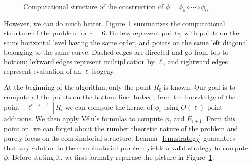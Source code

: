 \begin{figure}[t]
  \centering

  \caption{Computational structure of the construction of
    $\phi=\phi_5\circ\cdots\circ\phi_0$.}
  \label{fig:det}
\end{figure}

However, we can do much better. Figure~\ref{fig:det} summarizes the
computational structure of the problem for $e=6$.  Bullets represent
points, with points on the same horizontal level having the same order, and points on the
same left diagonal belonging to the same curve. Dashed edges are directed
and go from top to bottom; leftward edges represent multiplication by
$\ell$, and rightward edges represent evaluation of an $\ell$-isogeny.

At the beginning of the algorithm, only the point $R_0$ is known. Our
goal is to compute all the points on the bottom line. Indeed, from the
knowledge of the point $[\ell^{e-i-1}]R_i$ we can compute the kernel
of $\phi_i$ using $O(\ell)$ point additions. We then apply V\'elu's
formulas to compute $\phi_i$ and $E_{i+1}$. From this point on, we can
forget about the number theoretic nature of the problem and purely
focus on its combinatorial structure. Lemma~\ref{lem:strategy}
guarantees that any solution to the combinatorial problem yields a
valid strategy to compute $\phi$. Before stating it, we first formally
rephrase the picture in Figure~\ref{fig:det}.

